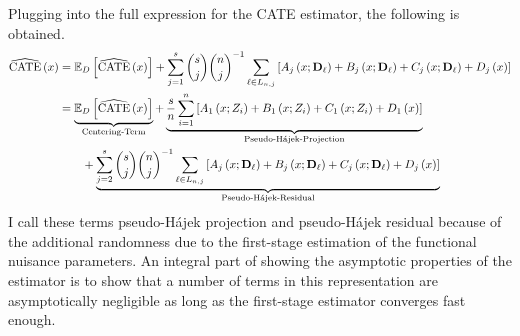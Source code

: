 Plugging into the full expression for the CATE estimator, the following is obtained.
\begin{equation}\label{eq:DNNDML2_Decomp}
    \begin{aligned}
        \widehat{\operatorname{CATE}}\left(x\right)
        & = \mathbb{E}_{D}\left[\widehat{\operatorname{CATE}}\left(x\right)\right] 
        + \sum_{j = 1}^{s} \binom{s}{j} \binom{n}{j}^{-1}\sum_{\ell \in L_{n,j}} \left[A_{j}\left(x; \mathbf{D}_{\ell}\right) + B_{j}\left(x; \mathbf{D}_{\ell}\right) + C_{j}\left(x; \mathbf{D}_{\ell}\right) + D_{j}\left(x\right)\right]\\
        & = \underbrace{\mathbb{E}_{D}\left[\widehat{\operatorname{CATE}}\left(x\right)\right]}_{\text{Centering-Term}}
        + \underbrace{\frac{s}{n} \sum_{i = 1}^{n} \left[A_{1}\left(x; Z_{i}\right) + B_{1}\left(x; Z_{i}\right) + C_{1}\left(x; Z_{i}\right) + D_{1}\left(x\right)\right]}_{\text{Pseudo-H\'ajek-Projection}}\\
        & \quad \quad + \underbrace{\sum_{j = 2}^{s} \binom{s}{j} \binom{n}{j}^{-1}\sum_{\ell \in L_{n,j}} \left[A_{j}\left(x; \mathbf{D}_{\ell}\right) + B_{j}\left(x; \mathbf{D}_{\ell}\right) + C_{j}\left(x; \mathbf{D}_{\ell}\right) + D_{j}\left(x\right)\right]}_{\text{Pseudo-H\'ajek-Residual}}
    \end{aligned}
\end{equation}
I call these terms pseudo-H\'ajek projection and pseudo-H\'ajek residual because of the additional randomness due to the first-stage estimation of the functional nuisance parameters.
An integral part of showing the asymptotic properties of the estimator is to show that a number of terms in this representation are asymptotically negligible as long as the first-stage estimator converges fast enough.
